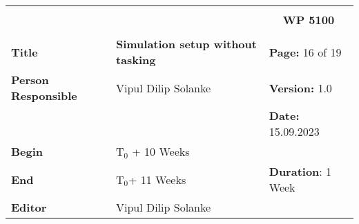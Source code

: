 \begin{table}[!h]
  \begin{center}
    \begin{tabular}{|p{35mm}||p{55mm}|p{50mm}||p{40mm}|}
      \hline
      \multicolumn{3}{|l||}{\textbf{}} & \multicolumn{1}{c|}{}                                                                                                                                                \\
      \multicolumn{3}{|l||}{\textbf{}} & \multicolumn{1}{c|}{\textbf{WP 5100}}                                                                                                                                \\
      \multicolumn{3}{|l||}{\textbf{}} & \multicolumn{1}{c|}{}                                                                                                                                                \\
      \hline\hline
      \textbf{Title}                   & \multicolumn{2}{p{7cm}||}{\textbf{Simulation setup without tasking}}
                                       & \textbf{Page:} 16 of 19                                                                                                                                             \\
      \hline
      \textbf{Person Responsible}        & \multicolumn{2}{l||}{Vipul Dilip Solanke}                                                                                                   & \textbf{Version:} 1.0   \\
      \hline
      \multicolumn{3}{|l||}{}          & \textbf{Date:} 15.09.2023                                                                                                                                          \\
      \hline\hline
      \textbf{Begin}                  & \multicolumn{2}{l||}{T$_0$ + 10 Weeks}                                                                                                                &                         \\
      \hline
      \textbf{End}                    & \multicolumn{2}{l||}{T$_0$+ 11 Weeks}                                                                                                        & \textbf{Duration}: 1 Week \\
      \hline\hline
      \textbf{Editor}              & \multicolumn{3}{l|}{Vipul Dilip Solanke}                                                                                                                              \\

\end{tabular}
\end{center}
\end{table}
